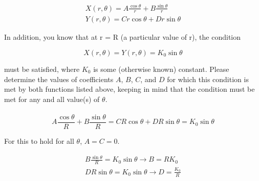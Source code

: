 \documentclass[a4paper]{article}
\begin{document}
\begin{gather*}
    X(r, \theta) = A \frac{\cos\theta}{r} + B \frac{\sin\theta}{r} \\
    Y(r, \theta) = C r \cos\theta + D r \sin \theta
\end{gather*}

In addition, you know that at r = R (a particular value of r), the condition

\[
    X(r, \theta) = Y(r, \theta) = K_0 \sin\theta
\]

must be satisfied, where $K_0$ is some (otherwise known) constant. Please determine the values of
coefficients $A$, $B$, $C$, and $D$ for which this condition is met by both functions listed above, keeping in
mind that the condition must be met for any and all value(s) of $\theta$. \\\\

\[
    A \frac{\cos\theta}{R} + B \frac{\sin\theta}{R} = C R \cos\theta + D R \sin \theta = K_0 \sin\theta
\]

For this to hold for all $\theta$, $A=C=0$.

\begin{gather*}
    B \frac{\sin\theta}{R} = K_0 \sin\theta \rightarrow B = R K_0 \\
    D R \sin \theta = K_0 \sin\theta \rightarrow D = \frac{K_0}{R}
\end{gather*}
\end{document}

